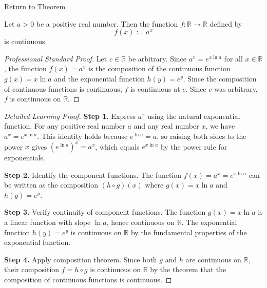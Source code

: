 \newpage
{}
\label{prf:exponentiation-continuous-base}

\begin{remark*}[Return]
\hyperref[thm:exponentiation-continuous-base]{Return to Theorem}
\end{remark*}

\begin{theorem*}
Let $a > 0$ be a positive real number. Then the function $f \colon \mathbb{R} \to \mathbb{R}$ defined by
\[
f(x) := a^x
\]
is continuous.
\end{theorem*}

\begin{proof}[Professional Standard Proof]
\LRAProofBodyStart
Let $c \in \mathbb{R}$ be arbitrary. Since $a^x = e^{x \ln a}$ for all $x \in \mathbb{R}$, the function $f(x) = a^x$ is the composition of the continuous function $g(x) = x \ln a$ and the exponential function $h(y) = e^y$. Since the composition of continuous functions is continuous, $f$ is continuous at $c$. Since $c$ was arbitrary, $f$ is continuous on $\mathbb{R}$.
\end{proof}

\begin{proof}[Detailed Learning Proof]
\LRAProofBodyStart

\textbf{Step 1.} Express $a^x$ using the natural exponential function. For any positive real number $a$ and any real number $x$, we have $a^x = e^{x \ln a}$. This identity holds because $e^{\ln a} = a$, so raising both sides to the power $x$ gives $(e^{\ln a})^x = a^x$, which equals $e^{x \ln a}$ by the power rule for exponentials.

\textbf{Step 2.} Identify the component functions. The function $f(x) = a^x = e^{x \ln a}$ can be written as the composition $(h \circ g)(x)$ where $g(x) = x \ln a$ and $h(y) = e^y$.

\textbf{Step 3.} Verify continuity of component functions. The function $g(x) = x \ln a$ is a linear function with slope $\ln a$, hence continuous on $\mathbb{R}$. The exponential function $h(y) = e^y$ is continuous on $\mathbb{R}$ by the fundamental properties of the exponential function.

\textbf{Step 4.} Apply composition theorem. Since both $g$ and $h$ are continuous on $\mathbb{R}$, their composition $f = h \circ g$ is continuous on $\mathbb{R}$ by the theorem that the composition of continuous functions is continuous.
\end{proof}


